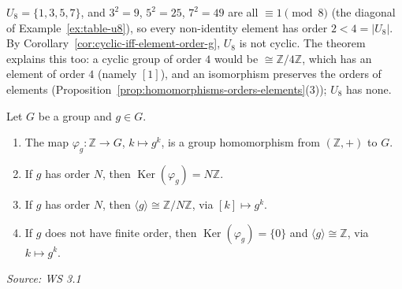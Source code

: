 \documentclass[11pt]{report}
\newcommand{\srcline}[1]{\par\hfill{\footnotesize\textit{Source: #1}}}
\begin{document}
\begin{exbox}\label{ex:u8-not-cyclic-classification}
$U_8 = \{1, 3, 5, 7\}$, and $3^2 = 9$, $5^2 = 25$, $7^2 = 49$ are all $\equiv 1 \pmod 8$ (the diagonal of Example~\ref{ex:table-u8}), so every non-identity element has order $2 < 4 = |U_8|$. By Corollary~\ref{cor:cyclic-iff-element-order-g}, $U_8$ is not cyclic. The theorem explains this too: a cyclic group of order $4$ would be $\cong \mathbb{Z}/4\mathbb{Z}$, which has an element of order $4$ (namely $[1]$), and an isomorphism preserves the orders of elements (Proposition~\ref{prop:homomorphisms-orders-elements}(3)); $U_8$ has none.
\end{exbox}

\begin{propbox}\label{prop:homomorphism-k-maps-gk-gen-g-iso-z-nz}
Let $G$ be a group and $g \in G$.
\begin{enumerate}
    \item The map $\varphi_g: \mathbb{Z} \to G$, $k \mapsto g^k$, is a group homomorphism from $(\mathbb{Z}, +)$ to $G$.
    \item If $g$ has order $N$, then $\operatorname{Ker}(\varphi_g) = N\mathbb{Z}$.
    \item If $g$ has order $N$, then $\langle g \rangle \cong \mathbb{Z}/N\mathbb{Z}$, via $[k] \mapsto g^k$.
    \item If $g$ does not have finite order, then $\operatorname{Ker}(\varphi_g) = \{0\}$ and $\langle g \rangle \cong \mathbb{Z}$, via $k \mapsto g^k$.
\end{enumerate}
\srcline{WS 3.1}
\end{propbox}
\end{document}
